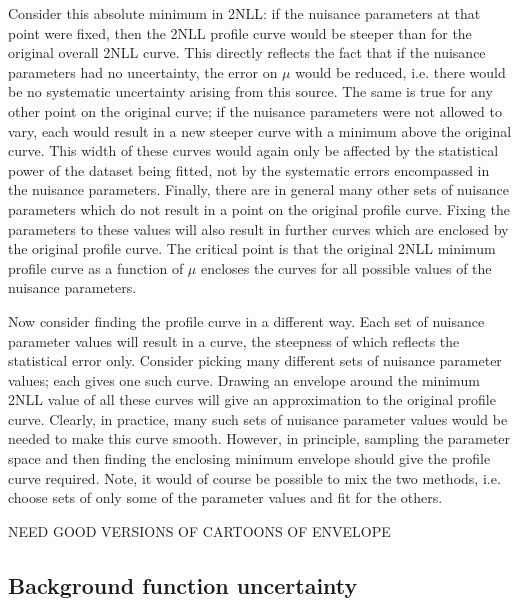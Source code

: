 Consider this absolute minimum in 2NLL: if the nuisance parameters at that
point were fixed, then the 2NLL profile curve would be steeper than for
the original overall 2NLL curve. This directly reflects the fact that
if the nuisance parameters had no uncertainty,
the error on $\mu$ would be reduced, i.e. there would be no systematic 
uncertainty arising from this source.
The same is true for any other point on the original curve; if the nuisance
parameters were not allowed to vary, each would result in a new steeper curve
with a minimum above the original curve.
This width of these curves would again only be affected by the statistical
power of the dataset being fitted, not by the systematic errors encompassed
in the nuisance parameters.
Finally, there are in general
many other sets of nuisance parameters which do not result in a point on the
original profile curve. Fixing the parameters to these values will also result
in further curves which are enclosed by the original profile curve.
The critical point is that the original 2NLL minimum profile curve as a function
of $\mu$ encloses the curves for all possible values of the nuisance
parameters.

Now consider finding the profile curve in a different way. Each set of nuisance
parameter values will result in a curve, the steepness of which reflects 
the statistical error only. Consider picking many different sets of nuisance
parameter values; each gives one such curve. Drawing an envelope around the
minimum 2NLL value of all these curves will give an approximation to the
original profile curve. Clearly, in practice, many such sets of nuisance
parameter values would be needed to make this curve smooth. However, in
principle, sampling the parameter space and then finding the enclosing
minimum envelope should give the profile curve required.
Note, it would of course be possible to mix the two methods, i.e.
choose sets of only some of the parameter values and fit for the others.

NEED GOOD VERSIONS OF CARTOONS OF ENVELOPE

\subsection{Background function uncertainty}
\label{sec:concept:functions}

